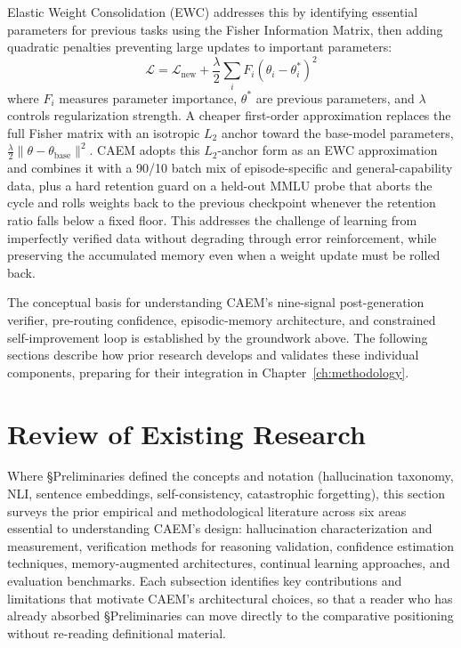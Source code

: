 Elastic Weight Consolidation (EWC) \cite{doi:10.1073/pnas.1611835114} addresses this by identifying essential parameters for previous tasks using the Fisher Information Matrix, then adding quadratic penalties preventing large updates to important parameters:
\begin{equation}
\mathcal{L} = \mathcal{L}_{\text{new}} + \frac{\lambda}{2} \sum_{i} F_i (\theta_i - \theta_i^*)^2
\end{equation}
where $F_i$ measures parameter importance, $\theta^*$ are previous parameters, and $\lambda$ controls regularization strength. A cheaper first-order approximation replaces the full Fisher matrix with an isotropic $L_2$ anchor toward the base-model parameters, $\frac{\lambda}{2}\lVert \theta - \theta_{\text{base}} \rVert^2$. CAEM adopts this $L_2$-anchor form as an EWC approximation and combines it with a 90/10 batch mix of episode-specific and general-capability data, plus a hard retention guard on a held-out MMLU probe that aborts the cycle and rolls weights back to the previous checkpoint whenever the retention ratio falls below a fixed floor. This addresses the challenge of learning from imperfectly verified data without degrading through error reinforcement, while preserving the accumulated memory even when a weight update must be rolled back.

The conceptual basis for understanding CAEM's nine-signal post-generation verifier, pre-routing confidence, episodic-memory architecture, and constrained self-improvement loop is established by the groundwork above. The following sections describe how prior research develops and validates these individual components, preparing for their integration in Chapter~\ref{ch:methodology}.

\section{Review of Existing Research}

Where §Preliminaries defined the concepts and notation (hallucination taxonomy, NLI, sentence embeddings, self-consistency, catastrophic forgetting), this section surveys the prior empirical and methodological literature across six areas essential to understanding CAEM's design: hallucination characterization and measurement, verification methods for reasoning validation, confidence estimation techniques, memory-augmented architectures, continual learning approaches, and evaluation benchmarks. Each subsection identifies key contributions and limitations that motivate CAEM's architectural choices, so that a reader who has already absorbed §Preliminaries can move directly to the comparative positioning without re-reading definitional material.


